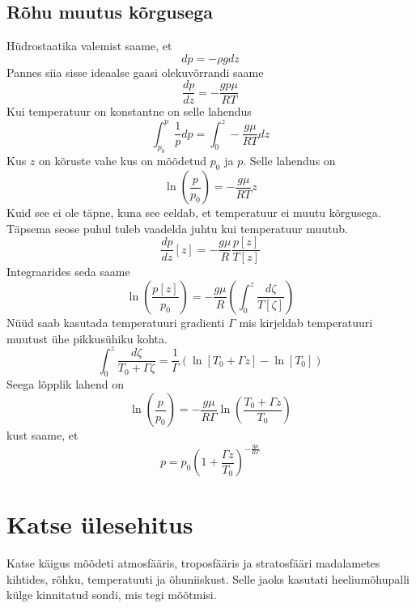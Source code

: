 \documentclass{trkut}%
\begin{document}
\section{Rõhu muutus kõrgusega}
Hüdrostaatika valemist saame, et 
\begin{equation*}
dp = -\rho g dz
\end{equation*}
Pannes siia sisse  ideaalse gaasi olekuvõrrandi saame
\begin{equation*}
\frac{dp}{dz} = -\frac{gp\mu}{RT}
\end{equation*}
Kui temperatuur on konstantne on selle lahendus
\begin{equation*}
\int_{p_0}^{p}\frac{1}{p}dp = \int_{0}^{z} -\frac{g\mu}{RT} dz
\end{equation*}
Kus $z$ on kõruste vahe kus on mõõdetud $p_0$ ja $p$. Selle lahendus on
\begin{equation*}
\ln \left( \frac{p}{p_0} \right) = - \frac{g\mu}{RT}z
\end{equation*}
Kuid see ei ole täpne, kuna see eeldab, et temperatuur ei muutu kõrgusega. Täpsema seose puhul tuleb vaadelda juhtu kui temperatuur muutub. 
\begin{equation*}
\frac{dp}{dz}[z] = -\frac{g\mu}{R}\frac{p[z]}{T[z]}
\end{equation*}
Integraarides seda saame
\begin{equation*}
\ln \left( \frac{p[z]}{p_0} \right) = - \frac{g\mu}{R} \left( \int_{0}^{z} \frac{d\zeta}{T[\zeta]}\right)
\end{equation*}
Nüüd saab kasutada temperatuuri gradienti $\Gamma$ mis kirjeldab temperatuuri muutust ühe pikkusühiku kohta.
\begin{equation*}
\int_{0}^{z} \frac{d\zeta}{T_0 + \Gamma \zeta} = \frac{1}{\Gamma}\left(\ln\left[T_0 + \Gamma z\right] - \ln\left[T_0\right]\right)
\end{equation*}
Seega lõpplik lahend on
\begin{equation*}
\ln\left(\frac{p}{p_0}\right) = -\frac{g\mu}{R\Gamma} \ln\left(\frac{T_0 + \Gamma z}{T_0}\right)
\end{equation*}
kust saame, et
\begin{equation*}
p = p_0 \left(1+\frac{\Gamma z}{T_0}\right)^{-\frac{g\mu}{R\Gamma}}
\end{equation*}


\chapter{Katse ülesehitus}
Katse käigus mõõdeti atmosfääris, troposfääris ja stratosfääri madalametes kihtides, rõhku, temperatuuti ja õhuniiskust. Selle jaoks kasutati heeliumõhupalli külge kinnitatud sondi, mis tegi mõõtmisi.
\end{document}
